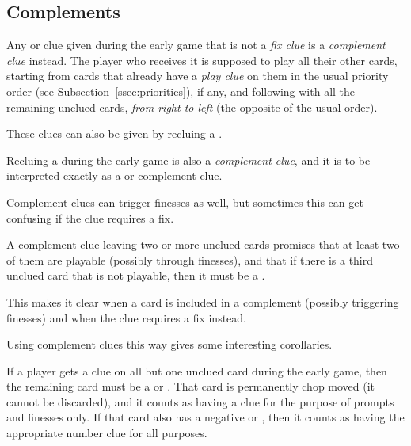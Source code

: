\subsection{Complements}

\begin{convention}
	Any  or  clue given during the early game that is not a \emph{fix clue} is a \emph{complement clue} instead. The player who receives it is supposed to play all their other cards, starting from cards that already have a \emph{play clue} on them in the usual priority order (see Subsection~\ref{ssec:priorities}), if any, and following with all the remaining unclued cards, \emph{from right to left} (the opposite of the usual order).
\end{convention}

These clues can also be given by recluing a .

\begin{convention}
	Recluing a  during the early game is also a \emph{complement clue}, and it is to be interpreted exactly as a  or  complement clue.
\end{convention}

Complement clues can trigger finesses as well, but sometimes this can get confusing if the clue requires a fix.

\begin{convention}
	A complement clue leaving two or more unclued cards promises that at least two of them are playable (possibly through finesses), and that if there is a third unclued card that is not playable, then it must be a .
\end{convention}

This makes it clear when a card is included in a complement (possibly triggering finesses) and when the clue requires a fix instead.

Using complement clues this way gives some interesting corollaries.

\begin{convention}
	If a player gets a  clue on all but one unclued card during the early game, then the remaining card must be a  or . That card is permanently chop moved (it cannot be discarded), and it counts as having a  clue for the purpose of prompts and finesses only. If that card also has a negative  or , then it counts as having the appropriate number clue for all purposes.
\end{convention}

